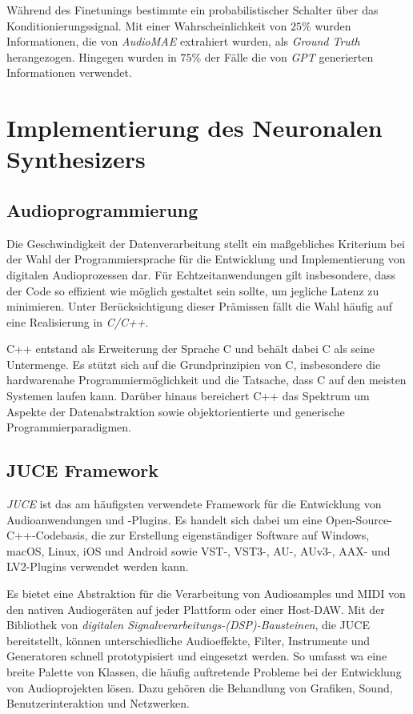 \documentclass[
  a4paper,  %
  twoside,  %
  bibliography=totoc,
  headsepline,
  cleardoublepage=empty,
  parskip=half,
  draft=false
]{scrbook}
\begin{document}
Während des Finetunings bestimmte ein probabilistischer Schalter über das Konditionierungssignal. Mit einer Wahrscheinlichkeit von $25\%$ wurden Informationen, die von \emph{AudioMAE} extrahiert wurden, als \emph{Ground Truth} herangezogen. Hingegen wurden in $75\%$ der Fälle die von \emph{GPT} generierten Informationen verwendet.

\section{Implementierung des Neuronalen Synthesizers}
\subsection{Audioprogrammierung}
Die Geschwindigkeit der Datenverarbeitung stellt ein maßgebliches Kriterium bei der Wahl der Programmiersprache für die Entwicklung und Implementierung von digitalen Audioprozessen dar. Für Echtzeitanwendungen gilt insbesondere, dass der Code so effizient wie möglich gestaltet sein sollte, um jegliche Latenz zu minimieren. Unter Berücksichtigung dieser Prämissen fällt die Wahl häufig auf eine Realisierung in \emph{C/C++}. \cite{doumler_c_2015, boulanger_audio_2011}

C++ entstand als Erweiterung der Sprache C und behält dabei C als seine Untermenge. Es stützt sich auf die Grundprinzipien von C, insbesondere die hardwarenahe Programmiermöglichkeit und die Tatsache, dass C auf den meisten Systemen laufen kann. Darüber hinaus bereichert C++ das Spektrum um Aspekte der Datenabstraktion sowie objektorientierte und generische Programmierparadigmen. \cite{stroustrup_c_1997}
\subsection{JUCE Framework}
\glqq\emph{JUCE} ist das am häufigsten verwendete Framework für die Entwicklung von Audioanwendungen und -Plugins. Es handelt sich dabei um eine Open-Source-C++-Codebasis, die zur Erstellung eigenständiger Software auf Windows, macOS, Linux, iOS und Android sowie VST-, VST3-, AU-, AUv3-, AAX- und LV2-Plugins verwendet werden kann.\grqq \cite{noauthor_juce_nodate-1}

Es bietet eine Abstraktion für die Verarbeitung von Audiosamples und MIDI von den nativen Audiogeräten auf jeder Plattform oder einer Host-DAW. Mit der Bibliothek von \emph{digitalen Signalverarbeitungs-(DSP)-Bausteinen}, die JUCE bereitstellt, können unterschiedliche Audioeffekte, Filter, Instrumente und Generatoren schnell prototypisiert und eingesetzt werden. \cite{noauthor_juce_nodate-1} So umfasst wa eine breite Palette von Klassen, die häufig auftretende Probleme bei der Entwicklung von Audioprojekten lösen. Dazu gehören die Behandlung von Grafiken, Sound, Benutzerinteraktion und Netzwerken. \cite{robinson_getting_2013}
\end{document}
